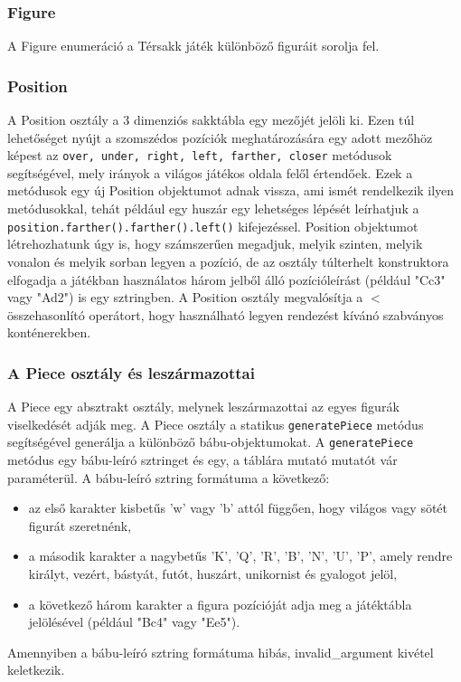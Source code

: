 \documentclass[12pt, twoside]{report}
\begin{document}
\subsubsection{Figure}
A Figure enumeráció a Térsakk játék különböző figuráit sorolja fel.

\subsubsection{Position}
A Position osztály a 3 dimenziós sakktábla egy mezőjét jelöli ki. Ezen túl lehetőséget nyújt a szomszédos pozíciók meghatározására egy adott mezőhöz képest az {\tt over, under, right, left, farther, closer} metódusok segítségével, mely irányok a világos játékos oldala felől értendőek. Ezek a metódusok egy új Position objektumot adnak vissza, ami ismét rendelkezik ilyen metódusokkal, tehát például egy huszár egy lehetséges lépését leírhatjuk a {\tt position.farther().farther().left()} kifejezéssel. Position objektumot létrehozhatunk úgy is, hogy számszerűen megadjuk, melyik szinten, melyik vonalon és melyik sorban legyen a pozíció, de az osztály túlterhelt konstruktora elfogadja a játékban használatos három jelből álló pozícióleírást (például "Cc3" vagy "Ad2") is egy sztringben. A Position osztály megvalósítja a $<$ összehasonlító operátort, hogy használható legyen rendezést kívánó szabványos konténerekben.

\subsubsection{A Piece osztály és leszármazottai}

A Piece egy absztrakt osztály, melynek leszármazottai  az egyes figurák viselkedését adják meg. A Piece osztály a statikus {\tt generatePiece} metódus segítségével generálja a különböző bábu-objektumokat. A {\tt generatePiece} metódus egy bábu-leíró sztringet és egy, a táblára mutató mutatót vár paraméterül. A bábu-leíró sztring formátuma a következő:
\begin{itemize}
	\item az első karakter kisbetűs 'w' vagy 'b' attól függően, hogy világos vagy sötét figurát szeretnénk,
	\item a második karakter a nagybetűs 'K', 'Q', 'R', 'B', 'N', 'U', 'P', amely rendre királyt, vezért, bástyát, futót, huszárt, unikornist és gyalogot jelöl,
	\item a következő három karakter a figura pozícióját adja meg a játéktábla jelölésével (például "Bc4" vagy "Ee5").
\end{itemize}
Amennyiben a bábu-leíró sztring formátuma hibás, invalid\_argument kivétel keletkezik.
\end{document}
